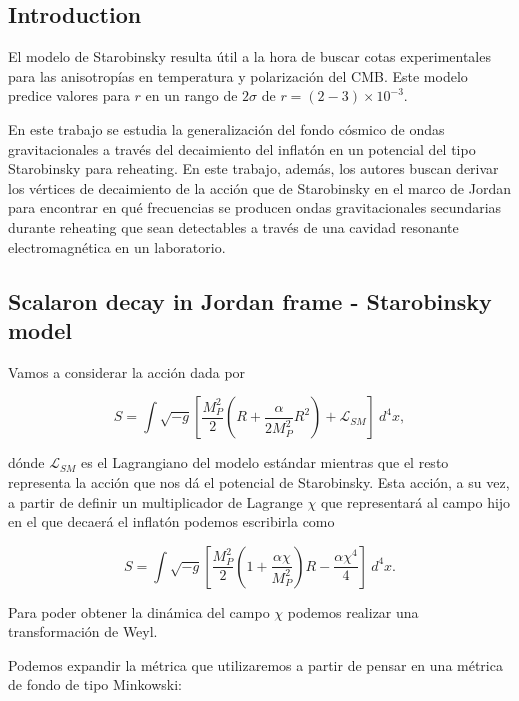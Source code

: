 \subsection{Introduction}

El modelo de Starobinsky resulta útil a la hora de buscar cotas experimentales para las anisotropías en temperatura y polarización del CMB. Este modelo predice valores para $r$ en un rango de $2 \sigma$  de $r = (2-3) \times 10^{-3}$.

En este trabajo se estudia la generalización del fondo cósmico de ondas gravitacionales a través del decaimiento del inflatón en un potencial del tipo Starobinsky para reheating. En este trabajo, además, los autores buscan derivar los vértices de decaimiento de la acción que de Starobinsky en el marco de Jordan para encontrar en qué frecuencias se producen ondas gravitacionales secundarias durante reheating que sean detectables a través de una cavidad resonante electromagnética en un laboratorio.

\subsection{Scalaron decay in Jordan frame - Starobinsky model}

Vamos a considerar la acción dada por

\begin{equation}
    S = \int \sqrt{-g} \left[ \frac{M_P^2}{2} \left( R + \frac{\alpha}{2 M^2_P} R^2 \right) + \mathcal{L}_{SM} \right] ~ d^4 x,
\end{equation}

\noindent
dónde $\mathcal{L}_{SM}$ es el Lagrangiano del modelo estándar mientras que el resto representa la acción que nos dá el potencial de Starobinsky. Esta acción, a su vez, a partir de definir un multiplicador de Lagrange $\chi$ que representará al campo hijo en el que decaerá el inflatón podemos escribirla como 

\begin{equation}
    S = \int \sqrt{-g} \left[ \frac{M_P^2}{2} \left( 1 + \frac{\alpha \chi}{M_P^2} \right) R - \frac{\alpha \chi^4}{4} \right] ~ d^4 x.
\end{equation}

\noindent
Para poder obtener la dinámica del campo $\chi$ podemos realizar una transformación de Weyl.

Podemos expandir la métrica que utilizaremos a partir de pensar en una métrica de fondo de tipo Minkowski:

